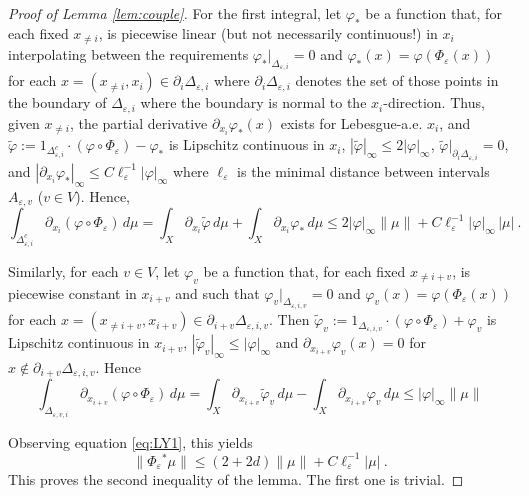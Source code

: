 \documentclass{amsart}
\numberwithin{equation}{section}
\begin{document}
\begin{proof}[Proof of Lemma \ref{lem:couple}]
  For the first integral, let ${\varphi}_*$ be a function that, for each fixed
  $x_{\neq i}$, is piecewise linear (but not necessarily continuous!) in $x_i$
  interpolating between the requirements ${\varphi}_*|_{\Delta_{{\varepsilon},i}}=0$ and
  ${\varphi}_*(x)={\varphi}(\Phi_{\varepsilon}(x))$ for each $x=(x_{\neq
    i},x_i)\in{\partial}_i\Delta_{{\varepsilon},i}$ where ${\partial}_i\Delta_{{\varepsilon},i}$
  denotes the set of those points in the boundary of $\Delta_{{\varepsilon},i}$ where
  the boundary is normal to the $x_i$-direction. Thus, given $x_{\neq i}$, the
  partial derivative ${\partial_{{x_i}}}{\varphi}_*(x)$ exists for Lebesgue-a.e. $x_i$, and
  $\tilde{\varphi}:={1}_{\Delta_{{\varepsilon},i}^c}\cdot({\varphi}\circ \Phi_{\varepsilon})-{\varphi}_*$ is
  Lipschitz continuous in $x_i$, $|\tilde{\varphi}|_\infty\leq2|{\varphi}|_\infty$,
  $\tilde{\varphi}|_{\partial_i\Delta_{{\varepsilon},i}}=0$, and $|{\partial_{{x_i}}}{\varphi}_*|_\infty\leq
  C\ell_{\varepsilon}^{-1}|{\varphi}|_\infty$ where $\ell_{\varepsilon}$ is the minimal distance between
  intervals $A_{{\varepsilon},v}$ ($v\in V$). Hence,
  \begin{displaymath}
    \int_{\Delta_{{\varepsilon},i}^c} {\partial_{{x_i}}}({\varphi}\circ\Phi_{\varepsilon})\, d\mu
    =
    \int_X {\partial_{{x_i}}}\tilde{\varphi}\,d\mu+\int_X {\partial_{{x_i}}}{\varphi}_*\, d\mu
    \leq
    2|{\varphi}|_\infty\|\mu\|+C\ell_{\varepsilon}^{-1}|{\varphi}|_\infty\,|\mu|\ .
  \end{displaymath}
  
  Similarly, for each $v\in V$, let ${\varphi}_v$ be a function that, for each fixed
  $x_{\neq i+v}$, is piecewise constant in $x_{i+v}$ and such that
  ${\varphi}_v|_{\Delta_{{\varepsilon},i,v}}=0$ and ${\varphi}_v(x)={\varphi}(\Phi_{\varepsilon}(x))$ for each
  $x=(x_{\neq i+v},x_{i+v})\in{\partial}_{i+v}\Delta_{{\varepsilon},i,v}$. Then
  $\tilde{\varphi}_v:={1}_{\Delta_{{\varepsilon},i,v}}   \cdot({\varphi}\circ\Phi_{\varepsilon}) +{\varphi}_v$ is Lipschitz continuous in
  $x_{i+v}$, $|\tilde{\varphi}_v|_\infty\leq|{\varphi}|_\infty$ and  ${\partial_{{x_{i+v}}}}{\varphi}_v(x)=0$  for 
  $x\not\in{\partial}_{i+v}\Delta_{{\varepsilon},i,v}$. Hence
  \begin{displaymath}
    \int_{\Delta_{{\varepsilon},v,i}} {\partial_{{x_{i+v}}}}({\varphi}\circ\Phi_{\varepsilon})\,d\mu
    =
    \int_X{\partial_{{x_{i+v}}}}\tilde{\varphi}_v\,d\mu-\int_X{\partial_{{x_{i+v}}}}{\varphi}_v\,d\mu
    \leq
    |{\varphi}|_\infty\|\mu\|
  \end{displaymath}

  Observing equation \eqref{eq:LY1}, this yields
  \begin{displaymath}
    \|\Phi_{\varepsilon}{^*}\mu\|\leq(2+2d)\|\mu\|+C\ell_{\varepsilon}^{-1}|\mu|\ .
  \end{displaymath}
  This proves the second inequality of the lemma. The first one is trivial.
\end{proof}
\end{document}
